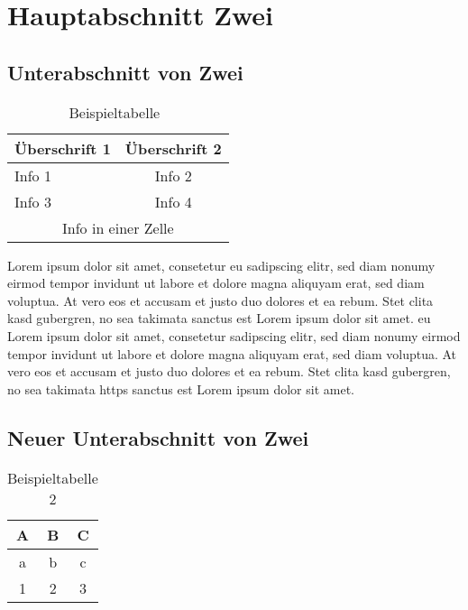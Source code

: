\section{Hauptabschnitt Zwei}\label{hauptabschnitt}

\Blindtext
\Blindtext

\subsection{Unterabschnitt von Zwei}\label{unterabschnitt_1}

\Blindtext
\Blindtext
\Blindtext
\begin{table}[!ht]
  \centering
    \caption[Beispieltabelle]{Beispieltabelle~\autocite[S.400]{KnutThea2009}}
    \label{table:Beispieltabelle}
    \begin{tabular}{ | l | c | }
      \hline
      Überschrift 1 & Überschrift 2 \\ \hline 
      Info 1 & Info 2 \\ \hline
      Info 3 & Info 4 \\ \hline
      \hline
      \multicolumn{2}{|c|}{Info in einer Zelle} \\
      \hline
    \end{tabular}
  \end{table}
\Blindtext


Lorem ipsum dolor sit amet, consetetur \ac{eu} sadipscing elitr, sed diam nonumy eirmod tempor invidunt ut labore et dolore magna aliquyam erat, sed diam voluptua. At vero eos et accusam et justo duo dolores et ea rebum. Stet clita 
kasd gubergren, no sea takimata sanctus est Lorem ipsum dolor sit amet. \ac{eu} Lorem ipsum dolor sit amet, consetetur sadipscing elitr, sed diam nonumy eirmod tempor invidunt ut labore et dolore magna aliquyam erat, sed diam voluptua. 
At vero eos et accusam et justo duo dolores et ea rebum. Stet clita kasd gubergren, no sea takimata \ac{https} sanctus est Lorem ipsum dolor sit amet.

\subsection{Neuer Unterabschnitt von Zwei}\label{unterabschnitt_2}

\Blindtext
  \begin{table}[!ht]
    \centering
    \caption[Beispieltabelle 2]{Beispieltabelle 2}
    \label{table:Beispieltabelle_2}
  \begin{tabular}{ccc}\toprule
    A&B&C \\ \midrule
    a&b&c \\ \cmidrule{1-3}
    1&2&3\\ \bottomrule
    \end{tabular}
  \end{table}
\Blindtext
\Blindtext



